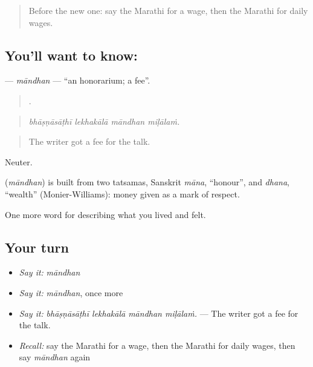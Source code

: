 \label{lesson:MR-C508-mandhan}



\begin{quote}
Before the new one: say the Marathi for a wage, then the Marathi for daily wages.
\end{quote}

\subsection*{You'll want to know: }
\textbf{} — \emph{māndhan} — \textquotedblleft{}an honorarium; a fee\textquotedblright{}.

\begin{quote}
   .
\end{quote}

\begin{quote}
\emph{bhāṣṇāsāṭhī lekhakālā māndhan miḷālaṁ.}
\end{quote}

\begin{quote}
The writer got a fee for the talk.
\end{quote}

Neuter.

\begin{cousinweb}
\textbf{} (\emph{māndhan}) is built from two tatsamas, Sanskrit \emph{māna}, \textquotedblleft{}honour\textquotedblright{}, and \emph{dhana}, \textquotedblleft{}wealth\textquotedblright{} (Monier-Williams): money given as a mark of respect.
\end{cousinweb}

\begin{grammarlens}[title={What you've built}]
One more word for describing what you lived and felt.
\end{grammarlens}

\subsection*{Your turn}
\begin{itemize}
\raggedright
  \item \emph{Say it:} \emph{māndhan}
  \item \emph{Say it:} \emph{māndhan}, once more
  \item \emph{Say it:} \emph{bhāṣṇāsāṭhī lekhakālā māndhan miḷālaṁ.} — The writer got a fee for the talk.
  \item \emph{Recall:} say the Marathi for a wage, then the Marathi for daily wages, then say \emph{māndhan} again
\end{itemize}

